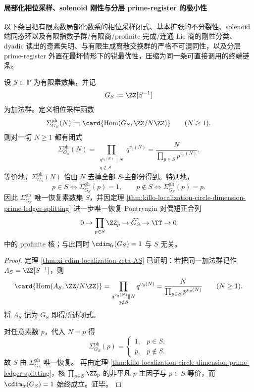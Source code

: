 \paragraph{局部化相位采样、solenoid 刚性与分层 prime-register 的极小性}
以下条目把有限素数局部化数系的相位采样闭式、基本扩张的不分裂性、solenoid 端同态环以及有限指数子群/有限商/profinite 完成/连通 Lie 商的刚性分类、dyadic 读出的奇素失明、与有限生成离散交换群的严格不可混同性，以及分层 prime-register 外置在最坏情形下的锐最优性，压缩为同一条可直接调用的终端链条。

\begin{theorem}[局部化数系相位采样函数的闭式与素数剥离律]\label{thm:xi-localized-phase-sampling-closed-form}
设 \(S\subset\mathbb P\) 为有限素数集，并记
\[
G_S:=\ZZ[S^{-1}]
\]
为加法群。定义相位采样函数
\[
\Sigma^{\mathrm{ph}}_{G_S}(N):=\card{\operatorname{Hom}(G_S,\ZZ/N\ZZ)}
\qquad(N\ge 1).
\]
则对一切 \(N\ge 1\) 都有闭式
\[
\boxed{\;
\Sigma^{\mathrm{ph}}_{G_S}(N)
=
\prod_{\substack{q^{v_q(N)}\parallel N\\ q\notin S}}q^{v_q(N)}
=
\frac{N}{\prod_{p\in S}p^{v_p(N)}}.\;}
\]
等价地，\(\Sigma^{\mathrm{ph}}_{G_S}(N)\) 恰由 \(N\) 去掉全部 \(S\)-主部分得到。特别地，
\[
p\in S \iff \Sigma^{\mathrm{ph}}_{G_S}(p)=1,
\qquad
p\notin S \iff \Sigma^{\mathrm{ph}}_{G_S}(p)=p.
\]
因此 \(\Sigma^{\mathrm{ph}}_{G_S}\) 唯一恢复素数集 \(S\)，并因定理 \ref{thm:killo-localization-circle-dimension-prime-ledger-splitting} 进一步唯一恢复 Pontryagin 对偶短正合列
\[
0\to \prod_{p\in S}\ZZ_p\to \widehat{G_S}\to \TT\to 0
\]
中的 profinite 核；与此同时 \(\cdim_{\mathrm{fr}}(G_S)=1\) 与 \(S\) 无关。
\end{theorem}
\begin{proof}
定理 \ref{thm:xi-cdim-localization-zeta-AS} 已证明：若把同一加法群记作
\(
A_S=\ZZ[S^{-1}]
\)，则
\[
\card{\operatorname{Hom}(A_S,\ZZ/N\ZZ)}
=
\prod_{\substack{q^{v_q(N)}\parallel N\\ q\notin S}}q^{v_q(N)}
=
\frac{N}{\prod_{p\in S}p^{v_p(N)}}
\qquad(N\ge 1).
\]
将 \(A_S\) 记为 \(G_S\) 即得所述闭式。
\par
对任意素数 \(p\)，代入 \(N=p\) 得
\[
\Sigma^{\mathrm{ph}}_{G_S}(p)=
\begin{cases}
1,& p\in S,\\[1mm]
p,& p\notin S.
\end{cases}
\]
故 \(S\) 由 \(\Sigma^{\mathrm{ph}}_{G_S}\) 唯一恢复。
再由定理 \ref{thm:killo-localization-circle-dimension-prime-ledger-splitting}，核
\(\prod_{p\in S}\ZZ_p\) 的非平凡 \(p\)-主因子与 \(p\in S\) 等价，而 \(\cdim_{\mathrm{fr}}(G_S)=1\) 始终成立。证毕。
\end{proof}

